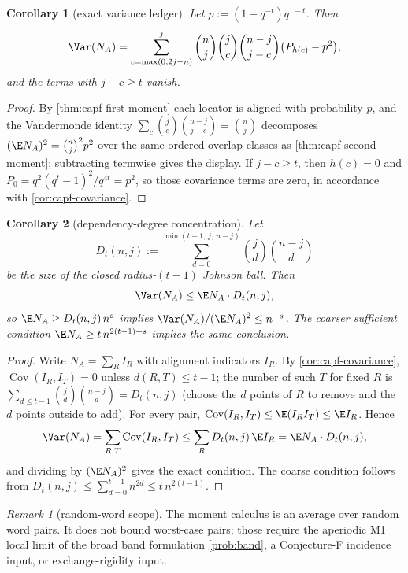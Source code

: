 \documentclass[11pt]{article}
\newtheorem{corollary}[corollary]{Corollary}
\theoremstyle{definition}
\theoremstyle{remark}
\newtheorem{remark}[remark]{Remark}
\begin{document}
\begin{corollary}[exact variance ledger]\label{cor:capf-exact-variance}
Let $p:=(1-q^{-t})q^{1-t}$.  Then
\[
\Var(N_A)=
\sum_{c=\max(0,2j-n)}^{j}
\binom{n}{j}\binom{j}{c}\binom{n-j}{j-c}
\bigl(P_{h(c)}-p^2\bigr),
\]
and the terms with $j-c\ge t$ vanish.
\end{corollary}

\begin{proof}
By \cref{thm:capf-first-moment} each locator is aligned with probability $p$, and the Vandermonde identity $\sum_c\binom jc\binom{n-j}{j-c}=\binom nj$ decomposes $(\E N_A)^2=\binom nj^2p^2$ over the same ordered overlap classes as \cref{thm:capf-second-moment}; subtracting termwise gives the display.  If $j-c\ge t$, then $h(c)=0$ and $P_0=q^2(q^t-1)^2/q^{4t}=p^2$, so those covariance terms are zero, in accordance with \cref{cor:capf-covariance}.
\end{proof}

\begin{corollary}[dependency-degree concentration]\label{cor:capf-dependency}
Let
\[
        D_t(n,j):=
        \sum_{d=0}^{\min(t-1,\,j,\,n-j)}
        \binom jd\binom{n-j}{d}
\]
be the size of the closed radius-$(t-1)$ Johnson ball.  Then
\[
        \Var(N_A)\le \E N_A\cdot D_t(n,j),
\]
so $\E N_A\ge D_t(n,j)\,n^s$ implies $\Var(N_A)/(\E N_A)^2\le n^{-s}$.  The coarser sufficient condition $\E N_A\ge t\,n^{2(t-1)+s}$ implies the same conclusion.
\end{corollary}

\begin{proof}
Write $N_A=\sum_RI_R$ with alignment indicators $I_R$.  By \cref{cor:capf-covariance}, $\operatorname{Cov}(I_R,I_T)=0$ unless $d(R,T)\le t-1$; the number of such $T$ for fixed $R$ is $\sum_{d\le t-1}\binom jd\binom{n-j}d=D_t(n,j)$ \textup{(choose the $d$ points of $R$ to remove and the $d$ points outside to add)}.  For every pair, $\operatorname{Cov}(I_R,I_T)\le\E(I_RI_T)\le\E I_R$.  Hence
\[
        \Var(N_A)=\sum_{R,T}\operatorname{Cov}(I_R,I_T)
        \le \sum_R D_t(n,j)\,\E I_R
        =\E N_A\cdot D_t(n,j),
\]
and dividing by $(\E N_A)^2$ gives the exact condition.  The coarse condition follows from $D_t(n,j)\le\sum_{d=0}^{t-1}n^{2d}\le t\,n^{2(t-1)}$.
\end{proof}

\begin{remark}[random-word scope]\label{rem:capf-moment-scope}
The moment calculus is an average over random word pairs.  It does not bound worst-case pairs; those require the aperiodic M1 local limit of the broad band formulation \cref{prob:band}, a Conjecture-F incidence input, or exchange-rigidity input.
\end{remark}
\end{document}
